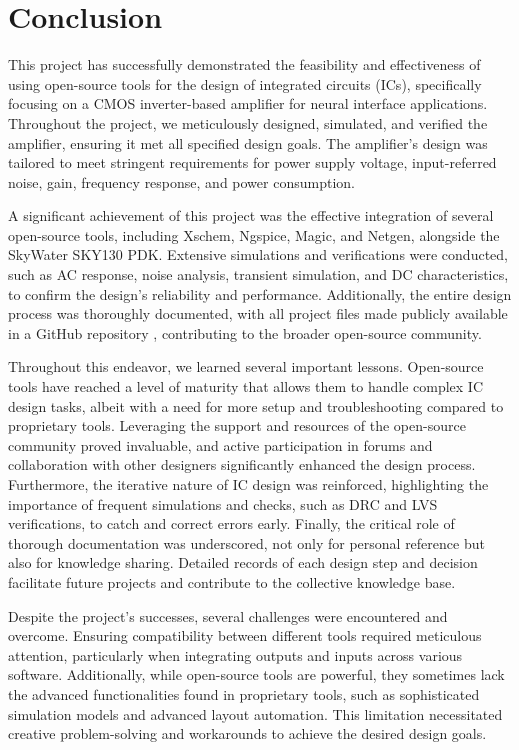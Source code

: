 \chapter{Conclusion}
\label{chap:conclusion}

This project has successfully demonstrated the feasibility and effectiveness of using open-source tools for the design of integrated circuits (ICs), specifically focusing on a CMOS inverter-based amplifier for neural interface applications. Throughout the project, we meticulously designed, simulated, and verified the amplifier, ensuring it met all specified design goals. The amplifier's design was tailored to meet stringent requirements for power supply voltage, input-referred noise, gain, frequency response, and power consumption.

A significant achievement of this project was the effective integration of several open-source tools, including Xschem, Ngspice, Magic, and Netgen, alongside the SkyWater SKY130 PDK. Extensive simulations and verifications were conducted, such as AC response, noise analysis, transient simulation, and DC characteristics, to confirm the design's reliability and performance. Additionally, the entire design process was thoroughly documented, with all project files made publicly available in a GitHub repository \cite{miguelcorrea0107_2024}, contributing to the broader open-source community.

Throughout this endeavor, we learned several important lessons. Open-source tools have reached a level of maturity that allows them to handle complex IC design tasks, albeit with a need for more setup and troubleshooting compared to proprietary tools. Leveraging the support and resources of the open-source community proved invaluable, and active participation in forums and collaboration with other designers significantly enhanced the design process. Furthermore, the iterative nature of IC design was reinforced, highlighting the importance of frequent simulations and checks, such as DRC and LVS verifications, to catch and correct errors early. Finally, the critical role of thorough documentation was underscored, not only for personal reference but also for knowledge sharing. Detailed records of each design step and decision facilitate future projects and contribute to the collective knowledge base.

Despite the project's successes, several challenges were encountered and overcome. Ensuring compatibility between different tools required meticulous attention, particularly when integrating outputs and inputs across various software. Additionally, while open-source tools are powerful, they sometimes lack the advanced functionalities found in proprietary tools, such as sophisticated simulation models and advanced layout automation. This limitation necessitated creative problem-solving and workarounds to achieve the desired design goals.


